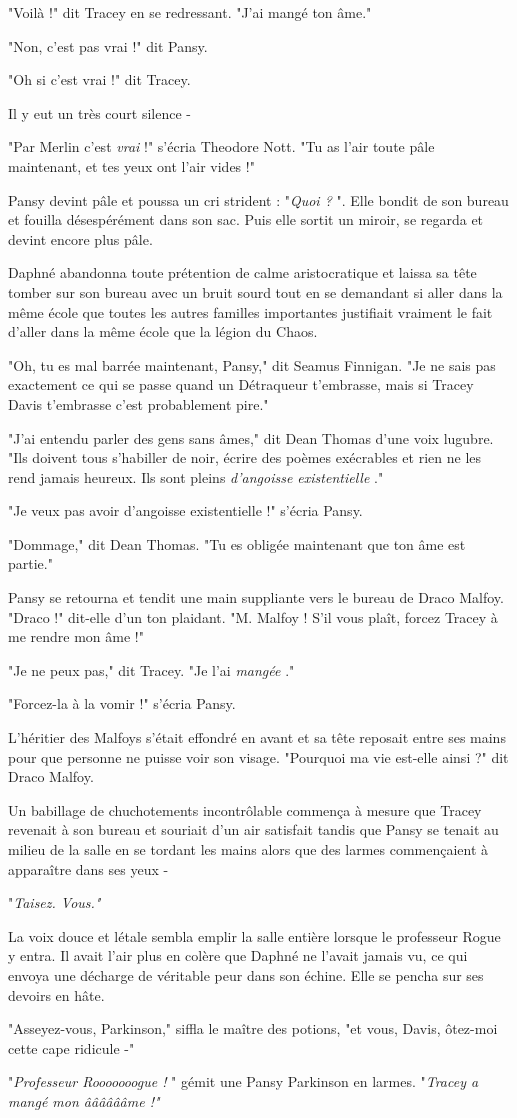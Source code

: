 "Voilà !" dit Tracey en se redressant. "J'ai mangé ton âme."

"Non, c'est pas vrai !" dit Pansy.

"Oh si c'est vrai !" dit Tracey.

Il y eut un très court silence -

"Par Merlin c'est \emph{vrai}  !" s'écria Theodore Nott. "Tu as l'air toute pâle maintenant, et tes yeux ont l'air vides !"

Pansy devint pâle et poussa un cri strident : "\emph{Quoi ?} ". Elle bondit de son bureau et fouilla désespérément dans son sac. Puis elle sortit un miroir, se regarda et devint encore plus pâle.

Daphné abandonna toute prétention de calme aristocratique et laissa sa tête tomber sur son bureau avec un bruit sourd tout en se demandant si aller dans la même école que toutes les autres familles importantes justifiait vraiment le fait d'aller dans la même école que la légion du Chaos.

"Oh, tu es mal barrée maintenant, Pansy," dit Seamus Finnigan. "Je ne sais pas exactement ce qui se passe quand un Détraqueur t'embrasse, mais si Tracey Davis t'embrasse c'est probablement pire."

"J'ai entendu parler des gens sans âmes," dit Dean Thomas d'une voix lugubre. "Ils doivent tous s'habiller de noir, écrire des poèmes exécrables et rien ne les rend jamais heureux. Ils sont pleins \emph{d'angoisse existentielle} ."

"Je veux pas avoir d'angoisse existentielle !" s'écria Pansy.

"Dommage," dit Dean Thomas. "Tu es obligée maintenant que ton âme est partie."

Pansy se retourna et tendit une main suppliante vers le bureau de Draco Malfoy. "Draco !" dit-elle d'un ton plaidant. "M. Malfoy ! S'il vous plaît, forcez Tracey à me rendre mon âme !"

"Je ne peux pas," dit Tracey. "Je l'ai \emph{mangée} ."

"Forcez-la à la vomir !" s'écria Pansy.

L'héritier des Malfoys s'était effondré en avant et sa tête reposait entre ses mains pour que personne ne puisse voir son visage. "Pourquoi ma vie est-elle ainsi ?" dit Draco Malfoy.

Un babillage de chuchotements incontrôlable commença à mesure que Tracey revenait à son bureau et souriait d'un air satisfait tandis que Pansy se tenait au milieu de la salle en se tordant les mains alors que des larmes commençaient à apparaître dans ses yeux -

"\emph{Taisez. Vous."} 

La voix douce et létale sembla emplir la salle entière lorsque le professeur Rogue y entra. Il avait l'air plus en colère que Daphné ne l'avait jamais vu, ce qui envoya une décharge de véritable peur dans son échine. Elle se pencha sur ses devoirs en hâte.

"Asseyez-vous, Parkinson," siffla le maître des potions, "et vous, Davis, ôtez-moi cette cape ridicule -"

"\emph{Professeur Rooooooogue !} " gémit une Pansy Parkinson en larmes. "\emph{Tracey a mangé mon ââââââme !"} 

